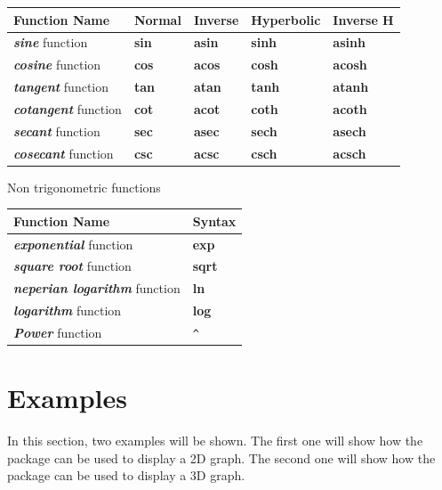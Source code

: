 \documentclass[a4paper,12pt]{article}
\begin{document}
\begin{center}
  \begin{tabular}{| m{3.8cm}| m{1.5cm} | m{1.5cm} | m{2.2cm} | m{2cm} |}
    \hline
    \textbf{Function Name} &\textbf{Normal} & \textbf{Inverse} & \textbf{Hyperbolic} & \textbf{Inverse H} \\ \hline
	\emph{\textbf{sine}} function& \textbf{sin} & \textbf{asin} & \textbf{sinh} & \textbf{asinh} \\ \hline
	\emph{\textbf{cosine}} function& \textbf{cos} & \textbf{acos} & \textbf{cosh} & \textbf{acosh}\\ \hline
	\emph{\textbf{tangent}} function & \textbf{tan} &\textbf{atan} & \textbf{tanh}&\textbf{atanh}\\ \hline
	\emph{\textbf{cotangent}} function & \textbf{cot} &\textbf{acot} &\textbf{coth} &\textbf{acoth}\\ \hline
	\emph{\textbf{secant}} function & \textbf{sec} &\textbf{asec} & \textbf{sech}&\textbf{asech}\\ \hline
	\emph{\textbf{cosecant}} function & \textbf{csc} & \textbf{acsc}& \textbf{csch}&\textbf{acsch}\\ \hline
 \end{tabular}
\end{center}

Non trigonometric functions
\begin{center}
  \begin{tabular}{| m{4.5cm}| m{1.5cm} |}
  	\hline
  	\textbf{Function Name} &\textbf{Syntax} \\ \hline
	\emph{\textbf{exponential}} function & \textbf{exp}\\ \hline
	\emph{\textbf{square root}} function &\textbf{sqrt}\\ \hline
	\emph{\textbf{neperian logarithm}} function &\textbf{ln}\\ \hline
	\emph{\textbf{logarithm}} function &\textbf{log}\\ \hline
	\emph{\textbf{Power}} function & \verb+^+ \\ \hline
 \end{tabular}
\end{center}
\section{Examples}
In this section, two examples will be shown. The first one will show how the package can be used to display a 2D graph. The second one will show how the package can be used to display a 3D graph.
\end{document}
